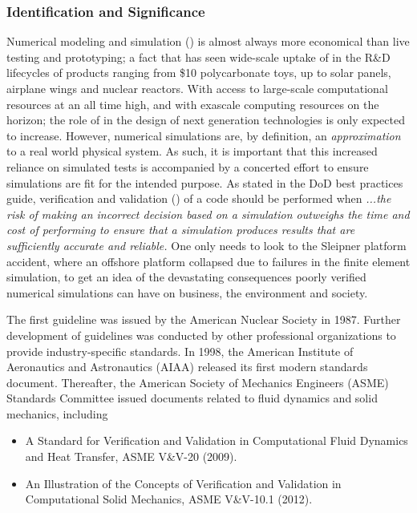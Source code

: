 \subsubsection{Identification and Significance}
\label{intro}
Numerical modeling and simulation (\MS) is almost always more economical than live testing and prototyping; a fact that has seen wide-scale uptake of \MS in the R\&D lifecycles of products ranging from \$10 polycarbonate toys, up to solar panels, airplane wings and nuclear reactors. With access to large-scale computational resources at an all time high, and with exascale computing resources on the horizon; the role of \MS in the design of next generation technologies is only expected to increase. However, numerical simulations are, by definition, an \emph{approximation} to a real world physical system. As such, it is important that this increased reliance on simulated tests is accompanied by a concerted effort to ensure simulations are fit for the intended purpose.  As stated in the DoD best practices guide, verification and validation (\VV) of a code should be performed when  \emph{...the risk of making an incorrect decision based on a simulation outweighs the time and cost of performing \VV to ensure that a simulation produces results that are sufficiently accurate and reliable.} One only needs to look to the Sleipner platform accident, where an offshore platform collapsed due to failures in the finite element simulation, to get an idea of the devastating consequences poorly verified numerical simulations can have on business, the environment and society.

The first \VV guideline was issued by the American Nuclear Society in 1987. Further development of \VV guidelines was conducted by other professional organizations to provide industry-specific standards. In 1998, the American Institute of Aeronautics and Astronautics (AIAA) released its first modern standards document. Thereafter, the American Society of Mechanics Engineers (ASME) \VV Standards Committee issued documents related to fluid dynamics and solid mechanics, including
\begin{itemize}
 \item A Standard for Verification and Validation in Computational Fluid Dynamics and Heat Transfer, ASME V\&V-20 (2009).
 \item An Illustration of the Concepts of Verification and Validation in Computational Solid Mechanics, ASME V\&V-10.1 (2012). 
\end{itemize}

